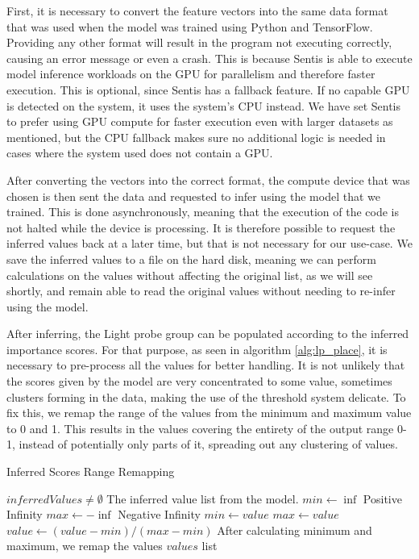 First, it is necessary to convert the feature vectors into the same data format that was used when the model was trained using Python and TensorFlow. Providing any other format will result in the program not executing correctly, causing an error message or even a crash. This is because Sentis is able to execute model inference workloads on the GPU for parallelism and therefore faster execution. This is optional, since Sentis has a fallback feature. If no capable GPU is detected on the system, it uses the system's CPU instead. We have set Sentis to prefer using GPU compute for faster execution even with larger datasets as mentioned, but the CPU fallback makes sure no additional logic is needed in cases where the system used does not contain a GPU. 

After converting the vectors into the correct format, the compute device that was chosen is then sent the data and requested to infer using the model that we trained. This is done asynchronously, meaning that the execution of the code is not halted while the device is processing. It is therefore possible to request the inferred values back at a later time, but that is not necessary for our use-case. We save the inferred values to a file on the hard disk, meaning we can perform calculations on the values without affecting the original list, as we will see shortly, and remain able to read the original values without needing to re-infer using the model.\newline

After inferring, the Light probe group can be populated according to the inferred importance scores. For that purpose, as seen in algorithm \ref{alg:lp_place}, it is necessary to pre-process all the values for better handling. It is not unlikely that the scores given by the model are very concentrated to some value, sometimes clusters forming in the data, making the use of the threshold system delicate. To fix this, we remap the range of the values from the minimum and maximum value to 0 and 1. This results in the values covering the entirety of the output range 0-1, instead of potentially only parts of it, spreading out any clustering of values.

\begin{algorithm}
	\caption{Inferred Scores Range Remapping}
	\label{alg:lp_place}
	\begin{algorithmic}[1]
		\Require $inferredValues \neq \emptyset$
		\Comment The inferred value list from the model.
		\State $min \gets \inf$
		\Comment Positive Infinity
		\State $max \gets -\inf$
		\Comment Negative Infinity
				\State $min \gets value$
				\State $max \gets value$
			\EndIf
		\EndFor
			\State $value \gets (value - min) / (max - min)$
			\Comment After calculating minimum and maximum, we remap the values
			\label{alg:lp_place:11}
		\EndFor
		\State \Return $values$ list
	\end{algorithmic}
\end{algorithm}

